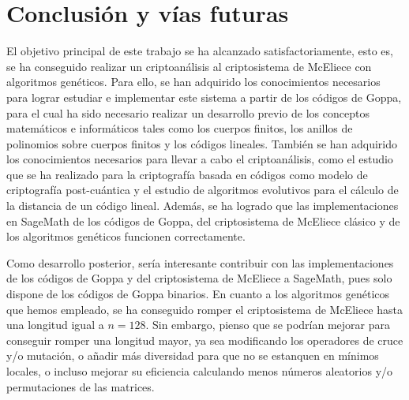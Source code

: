 \chapter*{Conclusión y vías futuras}

\begin{comment}
    Las conclusiones deberán incluir todas aquellas de tipo profesional y académico.
    Además, se deberá indicar si los objetivos han sido alcanzados totalmente, parcialmente o no alcanzados.
    Si hubiese posibles vías claras de desarrollo posterior sería interesante destacarlas aquí, poniéndolas en valor en el contexto inicial del trabajo.
\end{comment}


El objetivo principal de este trabajo se ha alcanzado satisfactoriamente, esto es, se ha conseguido realizar un criptoanálisis al criptosistema de McEliece con algoritmos genéticos. Para ello, se han adquirido los conocimientos necesarios para lograr estudiar e implementar este sistema a partir de los códigos de Goppa, para el cual ha sido necesario realizar un desarrollo previo de los conceptos matemáticos e informáticos tales como los cuerpos finitos, los anillos de polinomios sobre cuerpos finitos y los códigos lineales. También se han adquirido los conocimientos necesarios para llevar a cabo el criptoanálisis, como el estudio que se ha realizado para la criptografía basada en códigos como modelo de criptografía post-cuántica y el estudio de algoritmos evolutivos para el cálculo de la distancia de un código lineal. Además, se ha logrado que las implementaciones en SageMath de los códigos de Goppa, del criptosistema de McEliece clásico y de los algoritmos genéticos funcionen correctamente.

Como desarrollo posterior, sería interesante contribuir con las implementaciones de los códigos de Goppa y del criptosistema de McEliece a SageMath, pues solo dispone de los códigos de Goppa binarios. En cuanto a los algoritmos genéticos que hemos empleado, se ha conseguido romper el criptosistema de McEliece hasta una longitud igual a $n = 128$. Sin embargo, pienso que se podrían mejorar para conseguir romper una longitud mayor, ya sea modificando los operadores de cruce y/o mutación, o añadir más diversidad para que no se estanquen en mínimos locales, o incluso mejorar su eficiencia calculando menos números aleatorios y/o permutaciones de las matrices.